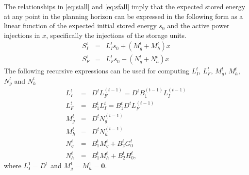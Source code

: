 \documentclass[12pt]{article}
\numberwithin{equation}{section}
\numberwithin{table}{section}
\numberwithin{figure}{section}
\begin{document}
The relationships in \eqref{eq:siall} and \eqref{eq:sfall} imply that the expected stored energy at any point in the planning horizon can be expressed in the following form as a linear function of the expected initial stored energy $s_0$ and the active power injections in $x$, specifically the injections of the storage units.
\begin{eqnarray}
S_I^t &=& L_I^t s_0 + (M^t_g + M^t_h) x \label{eq:simnall} \\
S_F^t &=& L_F^t s_0 + (N^t_g + N^t_h) x \label{eq:sfmnall}
\end{eqnarray}
The following recursive expressions can be used for computing $L_I^t$, $L_F^t$, $M^t_g$, $M^t_h$, $N^t_g$ and $N^t_h$
\begin{eqnarray}
L_I^t &=& D^t L_F^{(t-1)} = D^t B_1^{(t-1)} L_I^{(t-1)} \label{eq:LIt}	\\
L_F^t &=& B_1^t L_I^t = B_1^t D^t L_F^{(t-1)} \label{eq:LFt}	\\
M^t_g &=& D^t N^{(t-1)}_g \label{eq:Mtg}	\\
M^t_h &=& D^t N^{(t-1)}_h \label{eq:Mth}	\\
N^t_g &=& B_1^t M^t_g + B_2^t G_0^t \label{eq:Ntg}	\\
N^t_h &=& B_1^t M^t_h + B_2^t H_0^t, \label{eq:Nth}
\end{eqnarray}
where $L_I^1 = D^1$ and $M^1_g = M^1_h = \mathbf{0}$.
\end{document}
